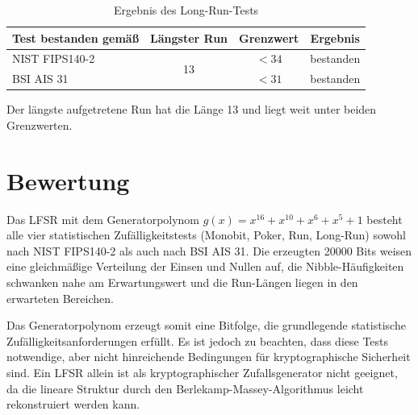 \documentclass[
    fontsize=12pt,          %
    paper=a4,               %
    numbers=noenddot,       %
    listof=totoc,           %
    listof=entryprefix,     %
    listof=nochaptergap,    %
    bibliography=totoc,     %
    parskip=half,           %
    openany                 %
]{scrbook}
\begin{document}
\begin{table}[H]
    \centering
    \begin{tabular}{l c c c}
        \toprule
        \textbf{Test bestanden gemäß} & \textbf{Längster Run} & \textbf{Grenzwert} & \textbf{Ergebnis} \\
        \midrule
        NIST FIPS140-2                & \multirow{2}{*}{13}   & $< 34$             & bestanden         \\
        BSI AIS 31                    &                       & $< 31$             & bestanden         \\
        \bottomrule
    \end{tabular}
    \caption{Ergebnis des Long-Run-Tests}
\end{table}

Der längste aufgetretene Run hat die Länge 13 und liegt weit unter beiden Grenzwerten.


\section*{Bewertung}

Das LFSR mit dem Generatorpolynom $g(x) = x^{16} + x^{10} + x^{6} + x^{5} + 1$ besteht alle vier statistischen Zufälligkeitstests (Monobit, Poker, Run, Long-Run) sowohl nach NIST FIPS140-2 als auch nach BSI AIS 31.
Die erzeugten 20000 Bits weisen eine gleichmäßige Verteilung der Einsen und Nullen auf, die Nibble-Häufigkeiten schwanken nahe am Erwartungswert und die Run-Längen liegen in den erwarteten Bereichen.

Das Generatorpolynom erzeugt somit eine Bitfolge, die grundlegende statistische Zufälligkeitsanforderungen erfüllt.
Es ist jedoch zu beachten, dass diese Tests notwendige, aber nicht hinreichende Bedingungen für kryptographische Sicherheit sind.
Ein LFSR allein ist als kryptographischer Zufallsgenerator nicht geeignet, da die lineare Struktur durch den Berlekamp-Massey-Algorithmus leicht rekonstruiert werden kann.

\end{document}
